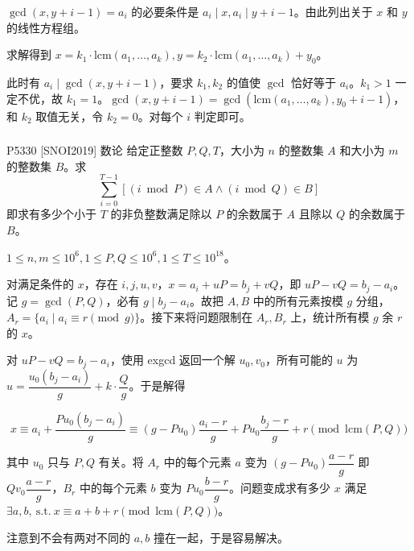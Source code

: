 \documentclass[../main.tex]{subfiles}
\begin{document}
\begin{frame}
$\gcd(x,y+i-1)=a_i$ 的必要条件是 $a_i\mid x,a_i\mid y+i-1$。由此列出关于 $x$ 和 $y$ 的线性方程组。 \pause

求解得到 $x=k_1\cdot\mathrm{lcm}(a_1,\dots,a_k),y=k_2\cdot\mathrm{lcm}(a_1,\dots,a_k)+y_0$。 \pause

此时有 $a_i\mid\gcd(x,y+i-1)$，要求 $k_1,k_2$ 的值使 $\gcd$ 恰好等于 $a_i$。$k_1>1$ 一定不优，故 $k_1=1$。$\gcd(x,y+i-1)=\gcd(\mathrm{lcm}(a_1,\dots,a_k),y_0+i-1)$，和 $k_2$ 取值无关，令 $k_2=0$。对每个 $i$ 判定即可。
\end{frame}

\subsubsection{}

\begin{frame}{P5330 [SNOI2019] 数论}
给定正整数 $P,Q,T$，大小为 $n$ 的整数集 $A$ 和大小为 $m$ 的整数集 $B$。求
$$
\sum_{i=0}^{T-1}[(i\bmod P)\in A \wedge(i\bmod Q)\in B]
$$
即求有多少个小于 $T$ 的非负整数满足除以 $P$ 的余数属于 $A$ 且除以 $Q$ 的余数属于 $B$。

$1\le n,m\le 10^6,1\le P,Q\le 10^6,1\le T\le 10^{18}$。
\end{frame}

\begin{frame}
对满足条件的 $x$，存在 $i,j,u,v$，$x=a_i+uP=b_j+vQ$，即 $uP-vQ=b_j-a_i$。记 $g=\gcd(P,Q)$，必有 $g\mid b_j-a_i$。故把 $A,B$ 中的所有元素按模 $g$ 分组，$A_r=\{a_i\mid a_i\equiv r\pmod g\}$。接下来将问题限制在 $A_r,B_r$ 上，统计所有模 $g$ 余 $r$ 的 $x$。 \pause

对 $uP-vQ=b_j-a_i$，使用 exgcd 返回一个解 $u_0,v_0$，所有可能的 $u$ 为 $u=\dfrac{u_0(b_j-a_i)}{g}+k\cdot\dfrac{Q}{g}$。于是解得

$$
x\equiv a_i+\dfrac{Pu_0(b_j-a_i)}{g}\equiv (g-Pu_0)\dfrac{a_i-r}{g}+Pu_0\dfrac{b_j-r}{g}+r\pmod{\mathrm{lcm}(P,Q)}
$$
\end{frame}

\begin{frame}
其中 $u_0$ 只与 $P,Q$ 有关。将 $A_r$ 中的每个元素 $a$ 变为 $(g-Pu_0)\dfrac{a-r}{g}$ 即 $Qv_0\dfrac{a-r}{g}$，$B_r$ 中的每个元素 $b$ 变为 $Pu_0\dfrac{b-r}{g}$。问题变成求有多少 $x$ 满足 $\exists a,b,\ \mathrm{s.t.}\ x\equiv a+b+r\pmod{\mathrm{lcm}(P,Q)}$。 \pause

注意到不会有两对不同的 $a,b$ 撞在一起，于是容易解决。
\end{frame}
\end{document}
